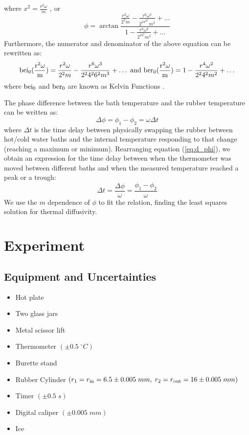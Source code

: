 \documentclass[12pt]{article}
\begin{document}
where $x^2=\frac{r^2\omega}{m}$ \autocite{manuall}, or
\begin{equation}
    \phi=\arctan\frac{\frac{r^2\omega}{2^2m}-\frac{r^6\omega^3}{2^24^26^2m^3}+\dots}{1-\frac{r^4\omega^2}{2^24^2m^2}+\dots}
    \label{eq:phase1}
\end{equation}
Furthermore, the numerator and denominator of the above equation can be rewritten as: 
\begin{equation}
{\rm bei_0(\frac{r^2\omega}{m})} =\frac{r^2\omega}{2^2m}-\frac{r^6\omega^3}{2^24^26^2m^3}+\dots\text{ and }{\rm ber_{0}(\frac{r^2\omega}{m})} = 1-\frac{r^4\omega^2}{2^24^2m^2}+\dots
\label{eq:bb}
\end{equation}
where ${\rm bei_{0}}$ and ${\rm ber_{0}}$ are known as Kelvin Functions \autocite{Oldham2009}.

The phase difference between the bath temperature and the rubber temperature can be written as: 
\begin{equation}
    \Delta\phi = \phi_1 - \phi_2 = \omega\Delta t
    \label{eq:d_phi}
\end{equation}
where $\Delta t$ is the time delay between physically swapping the rubber between hot/cold water baths and the internal temperature responding to that change (reaching a maximum or minimum). Rearranging equation (\ref{eq:d_phi}), we obtain an expression for the time delay between when the thermometer was moved between different baths and when the measured temperature reached a peak or a trough:
\begin{equation}
    \Delta t=\frac{\Delta\phi}{\omega}=\frac{\phi_1-\phi_2}{\omega}
    \label{eq:dt}
\end{equation}
We use the $m$ dependence of $\phi$ to fit the relation, finding the least squares solution for thermal diffusivity.

\section{Experiment}
\subsection{Equipment and Uncertainties}
\begin{itemize}
    \item Hot plate
    \item Two glass jars
    \item Metal scissor lift
    \item Thermometer $(\pm 0.5\;^\circ C)$
    \item Burette stand
    \item Rubber Cylinder $(r_1=r_{\rm in}=6.5\pm0.005\;{ mm},\;r_2=r_{\rm out}=16\pm0.005\;{ mm})$
    \item Timer $(\pm 0.5\;s)$
    \item Digital caliper $(\pm 0.005\;mm)$
    \item Ice
\end{itemize}
\end{document}
